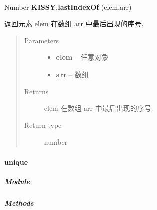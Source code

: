 \documentclass[letterpaper,10pt,english]{sphinxmanual}
\begin{document}
\begin{fulllineitems}
\label{api/seed/lang/lastIndexOf:Lang.KISSY.lastIndexOf}~
\begin{DUlineblock}{0em}
\item[] Number \textbf{KISSY.lastIndexOf} (elem,arr)
\item[] 返回元素 elem 在数组 arr 中最后出现的序号.
\end{DUlineblock}
\begin{quote}\begin{description}
\item[{Parameters}] \leavevmode\begin{itemize}
\item {}
\textbf{elem} -- 任意对象

\item {}
\textbf{arr} -- 数组

\end{itemize}

\item[{Returns}] \leavevmode
elem 在数组 arr 中最后出现的序号.

\item[{Return type}] \leavevmode
number

\end{description}\end{quote}

\end{fulllineitems}



\paragraph{unique}
\label{api/seed/lang/unique:unique}\label{api/seed/lang/unique::doc}

\subparagraph{Module}
\label{api/seed/lang/unique:module}\begin{quote}

{\hyperref[api/seed/lang/index:module-Lang]{}}
\end{quote}


\subparagraph{Methods}
\label{api/seed/lang/unique:methods}
\end{document}
